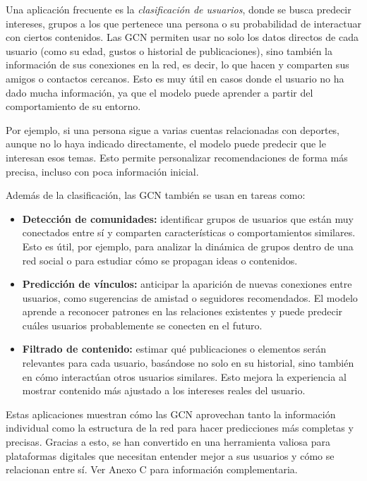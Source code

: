 \documentclass[11pt]{article} %
\begin{document}
Una aplicación frecuente es la \textit{clasificación de usuarios}, donde se busca predecir intereses, grupos a los que pertenece una persona o su probabilidad de interactuar con ciertos contenidos. Las GCN permiten usar no solo los datos directos de cada usuario (como su edad, gustos o historial de publicaciones), sino también la información de sus conexiones en la red, es decir, lo que hacen y comparten sus amigos o contactos cercanos. Esto es muy útil en casos donde el usuario no ha dado mucha información, ya que el modelo puede aprender a partir del comportamiento de su entorno.

Por ejemplo, si una persona sigue a varias cuentas relacionadas con deportes, aunque no lo haya indicado directamente, el modelo puede predecir que le interesan esos temas. Esto permite personalizar recomendaciones de forma más precisa, incluso con poca información inicial.

Además de la clasificación, las GCN también se usan en tareas como:

\begin{itemize}
    \item \textbf{Detección de comunidades:} identificar grupos de usuarios que están muy conectados entre sí y comparten características o comportamientos similares. Esto es útil, por ejemplo, para analizar la dinámica de grupos dentro de una red social o para estudiar cómo se propagan ideas o contenidos.
    
    \item \textbf{Predicción de vínculos:} anticipar la aparición de nuevas conexiones entre usuarios, como sugerencias de amistad o seguidores recomendados. El modelo aprende a reconocer patrones en las relaciones existentes y puede predecir cuáles usuarios probablemente se conecten en el futuro.
    
    \item \textbf{Filtrado de contenido:} estimar qué publicaciones o elementos serán relevantes para cada usuario, basándose no solo en su historial, sino también en cómo interactúan otros usuarios similares. Esto mejora la experiencia al mostrar contenido más ajustado a los intereses reales del usuario.
\end{itemize}

Estas aplicaciones muestran cómo las GCN aprovechan tanto la información individual como la estructura de la red para hacer predicciones más completas y precisas. Gracias a esto, se han convertido en una herramienta valiosa para plataformas digitales que necesitan entender mejor a sus usuarios y cómo se relacionan entre sí. Ver Anexo C para información complementaria.
\end{document}

